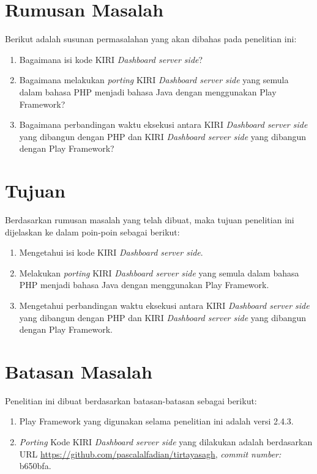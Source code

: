 \section{Rumusan Masalah}
\label{sec:rumusan_masalah}
Berikut adalah susunan permasalahan yang akan dibahas pada penelitian ini:
	\begin{enumerate}
		\item Bagaimana isi kode KIRI \textit{Dashboard server side}?
		\item Bagaimana melakukan \textit{porting} KIRI \textit{Dashboard server side} yang semula dalam bahasa PHP menjadi bahasa Java dengan menggunakan Play Framework?
		\item Bagaimana perbandingan waktu eksekusi antara KIRI \textit{Dashboard server side} yang dibangun dengan PHP dan KIRI \textit{Dashboard server side} yang dibangun dengan Play Framework?
	\end{enumerate}
	
\section{Tujuan}
\label{sec:tujuan}
Berdasarkan rumusan masalah yang telah dibuat, maka tujuan penelitian ini dijelaskan ke dalam poin-poin sebagai berikut:
	\begin{enumerate}
		\item Mengetahui isi kode KIRI \textit{Dashboard server side}.
		\item Melakukan \textit{porting} KIRI \textit{Dashboard server side} yang semula dalam bahasa PHP menjadi bahasa Java dengan menggunakan Play Framework.
		\item Mengetahui perbandingan waktu eksekusi antara KIRI \textit{Dashboard server side} yang dibangun dengan PHP dan KIRI \textit{Dashboard server side} yang dibangun dengan Play Framework.
	\end{enumerate}
	
\section{Batasan Masalah}
\label{sec:batasan_masalah}
Penelitian ini dibuat berdasarkan batasan-batasan sebagai berikut:
	\begin{enumerate}
		\item Play Framework yang digunakan selama penelitian ini adalah versi 2.4.3.
		\item \textit{Porting} Kode KIRI \textit{Dashboard server side} yang dilakukan adalah berdasarkan URL \url{https://github.com/pascalalfadian/tirtayasagh}, \textit{commit number:} b650bfa.
	\end{enumerate}
	
